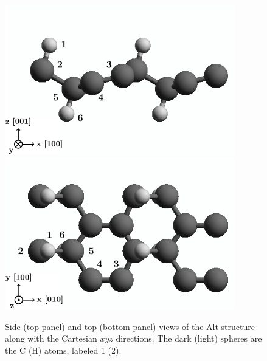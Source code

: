 \documentclass[floatfix,prb,aps,superscriptaddress,showpacs,11pt,preprint,letterpaper]{revtex4}
\def\tama{10cm}
\begin{document}
\begin{figure}[ht!]
    \centering
    \includegraphics[width=\tama]{figures/altstruc2}
    \\
    \includegraphics[width=\tama]{figures/altstruc1}
    \caption{Side (top panel) and top (bottom panel) views of the Alt
      structure along with the 
      Cartesian $xyz$ directions. The dark (light) spheres are the C (H) atoms,
      labeled 1 (2).
}
    \label{fig:alt-struc}
\end{figure}
\end{document}
